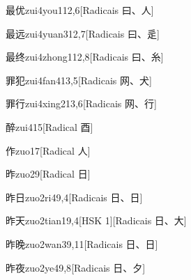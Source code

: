 \begin{entry}{最优}{zui4you1}{12,6}[Radicais ⽈、⼈]
\end{entry}

\begin{entry}{最远}{zui4yuan3}{12,7}[Radicais ⽈、⾡]
\end{entry}

\begin{entry}{最终}{zui4zhong1}{12,8}[Radicais ⽈、⽷]
\end{entry}

\begin{entry}{罪犯}{zui4fan4}{13,5}[Radicais ⽹、⽝]
\end{entry}

\begin{entry}{罪行}{zui4xing2}{13,6}[Radicais ⽹、⾏]
\end{entry}

\begin{entry}{醉}{zui4}{15}[Radical ⾣]
\end{entry}

\begin{entry}{作}{zuo1}{7}[Radical ⼈]
\end{entry}

\begin{entry}{昨}{zuo2}{9}[Radical ⽇]
\end{entry}

\begin{entry}{昨日}{zuo2ri4}{9,4}[Radicais ⽇、⽇]
\end{entry}

\begin{entry}{昨天}{zuo2tian1}{9,4}[HSK 1][Radicais ⽇、⼤]
\end{entry}

\begin{entry}{昨晚}{zuo2wan3}{9,11}[Radicais ⽇、⽇]
\end{entry}

\begin{entry}{昨夜}{zuo2ye4}{9,8}[Radicais ⽇、⼣]
\end{entry}

